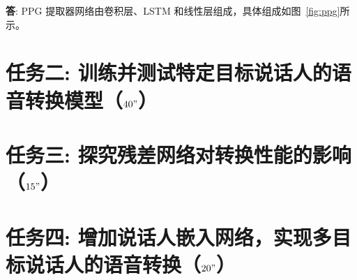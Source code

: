 \documentclass[degree=project,degree-type=project,cjk-font=noto]{thuthesis}
\begin{document}
\textbf{答}: PPG 提取器网络由卷积层、LSTM 和线性层组成，具体组成如图~\ref{fig:ppg}所示。

\chapter{任务二: 训练并测试特定目标说话人的语音转换模型（$40"$）}

\chapter{任务三: 探究残差网络对转换性能的影响（$15"$）}

\chapter{任务四: 增加说话人嵌入网络，实现多目标说话人的语音转换（$20"$）}

\backmatter


\appendix
\end{document}
